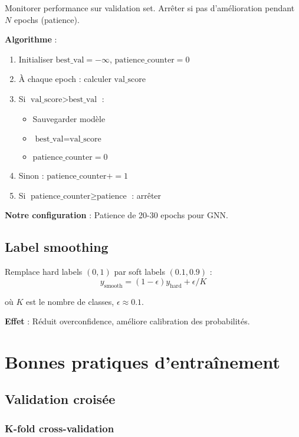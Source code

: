 Monitorer performance sur validation set. Arrêter si pas d'amélioration pendant $N$ epochs (patience).

\textbf{Algorithme} :
\begin{enumerate}
    \item Initialiser $\text{best\_val} = -\infty$, $\text{patience\_counter} = 0$
    \item À chaque epoch : calculer $\text{val\_score}$
    \item Si $\text{val\_score} > \text{best\_val}$ :
        \begin{itemize}
            \item Sauvegarder modèle
            \item $\text{best\_val} = \text{val\_score}$
            \item $\text{patience\_counter} = 0$
        \end{itemize}
    \item Sinon : $\text{patience\_counter} += 1$
    \item Si $\text{patience\_counter} \geq \text{patience}$ : arrêter
\end{enumerate}

\textbf{Notre configuration} : Patience de 20-30 epochs pour GNN.

\subsection{Label smoothing}

Remplace hard labels $(0, 1)$ par soft labels $(0.1, 0.9)$ :
\[
y_{\text{smooth}} = (1 - \epsilon) y_{\text{hard}} + \epsilon / K
\]

où $K$ est le nombre de classes, $\epsilon \approx 0.1$.

\textbf{Effet} : Réduit overconfidence, améliore calibration des probabilités.

\section{Bonnes pratiques d'entraînement}

\subsection{Validation croisée}

\subsubsection{K-fold cross-validation}

